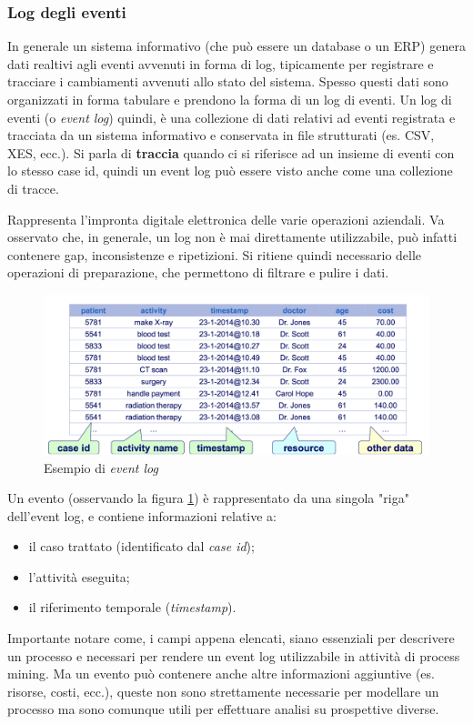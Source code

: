 \subsubsection{Log degli eventi}
In generale un sistema informativo (che può essere un database o un ERP) genera dati realtivi agli eventi avvenuti in forma di log, tipicamente per registrare e tracciare i cambiamenti avvenuti allo stato del sistema.
Spesso questi dati sono organizzati in forma tabulare e prendono la forma di un log di eventi.
Un log di eventi (o \textit{event log}) quindi, è una collezione di dati relativi ad eventi registrata e tracciata da un sistema informativo e conservata in file strutturati (es. CSV, XES, ecc.).
Si parla di \textbf{traccia} quando ci si riferisce ad un insieme di eventi con lo stesso case id, quindi un event log può essere visto anche come una collezione di tracce.

Rappresenta l'impronta digitale elettronica delle varie operazioni aziendali. 
Va osservato che, in generale, un log non è mai direttamente utilizzabile, può infatti contenere gap, inconsistenze e ripetizioni. Si ritiene quindi necessario delle operazioni di preparazione, che permettono di filtrare e pulire i dati.

\begin{figure}[H] 
    \centering 
    \includegraphics[width=0.9\columnwidth]{immagini/event_log_ex.png} 
    \caption{Esempio di \textit{event log} \cite{site:event-log-img}}
    \label{fig:event-log-img}
\end{figure}

Un evento (osservando la figura \ref{fig:event-log-img}) è rappresentato da una singola "riga" dell'event log, e contiene informazioni relative a:
\begin{itemize}
\item il caso trattato (identificato dal \textit{case id});
\item l'attività eseguita;
\item il riferimento temporale (\textit{timestamp}).
\end{itemize}
Importante notare come, i campi appena elencati, siano essenziali per descrivere un processo e necessari per rendere un event log utilizzabile in attività di process mining.
Ma un evento può contenere anche altre informazioni aggiuntive (es. risorse, costi, ecc.), queste non sono strettamente necessarie per modellare un processo ma sono comunque utili per effettuare analisi su prospettive diverse.

